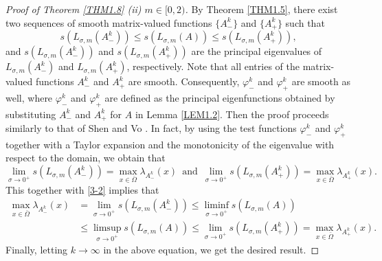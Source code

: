 \documentclass[11pt,reqno]{amsart}
\numberwithin{equation}{section}
\begin{document}
\begin{proof}[Proof of Theorem \ref{THM1.8} (ii) $\mathit{m\in [0,2)}$]
By Theorem \ref{THM1.5}, there exist two sequences of smooth matrix-valued functions $\{A^{k}_{-}\}$ and $\{A^{k}_{+}\}$ such that
\begin{equation}\label{3-2}
s(L_{\sigma,m}(A^{k}_{-}))
\leq
s(L_{\sigma,m}(A))
\leq
s(L_{\sigma,m}(A^{k}_{+})),
\end{equation}
and $s(L_{\sigma,m}(A^{k}_{-}))$ and $s(L_{\sigma,m}(A^{k}_{+}))$ are the principal eigenvalues of $L_{\sigma,m}(A^{k}_{-})$ and $L_{\sigma,m}(A^{k}_{+})$, respectively.
Note that all entries of the matrix-valued functions  $A^{k}_{-}$ and $A^{k}_{+}$ are smooth.
Consequently, $\varphi^{k}_{-}$ and $\varphi^{k}_{+}$ are smooth as well, where $\varphi^{k}_{-}$ and $\varphi^{k}_{+}$ are defined as the principal eigenfunctions obtained by substituting $A^{k}_{-}$ and $A^{k}_{+}$ for $A$ in Lemma \ref{LEM1.2}.
Then the proof proceeds similarly to that of Shen and Vo \cite[Theorem D]{ShenVo}.
In fact, by using the test functions $\varphi^{k}_{-}$ and $\varphi^{k}_{+}$
together with a Taylor expansion and the monotonicity of the eigenvalue with respect to the domain, we obtain that
\begin{equation*}
\lim_{ \sigma \to 0^{+} } s(L_{\sigma,m}(A^{k}_{-})) =
\max_{x\in\bar{\Omega}} \lambda_{A^{k}_{-}}(x)
\enspace \text{and} \enspace
\lim_{ \sigma \to 0^{+} } s(L_{\sigma,m}(A^{k}_{+})) =
\max_{x\in\bar{\Omega}} \lambda_{A^{k}_{+}}(x).
\end{equation*}
This together with \eqref{3-2} implies that
\begin{align*}
\max_{x\in\bar{\Omega}} \lambda_{A^{k}_{-}}(x) & =
\lim_{ \sigma \to 0^{+} } s\left(L_{\sigma,m}(A^{k}_{-})\right)
\leq
\liminf_{ \sigma \to 0^{+} } s\left(L_{\sigma,m}(A)\right) \\
& \leq
\limsup_{ \sigma \to 0^{+} } s\left(L_{\sigma,m}(A)\right)
\leq
\lim_{ \sigma \to 0^{+} } s\left(L_{\sigma,m}(A^{k}_{+})\right) =
\max_{x\in\bar{\Omega}} \lambda_{A^{k}_{+}}(x).
\end{align*}
Finally, letting $k \to \infty$ in the above equation, we get the desired result.

\end{proof}
\end{document}
